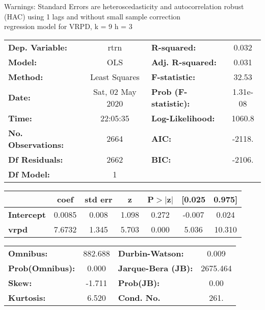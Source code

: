 Warnings: \newline
 [1] Standard Errors are heteroscedasticity and autocorrelation robust (HAC) using 1 lags and without small sample correction\\ 

regression model for VRPD, k = 9 h = 3\begin{center}
\begin{tabular}{lclc}
\toprule
\textbf{Dep. Variable:}    &       rtrn       & \textbf{  R-squared:         } &     0.032   \\
\textbf{Model:}            &       OLS        & \textbf{  Adj. R-squared:    } &     0.031   \\
\textbf{Method:}           &  Least Squares   & \textbf{  F-statistic:       } &     32.53   \\
\textbf{Date:}             & Sat, 02 May 2020 & \textbf{  Prob (F-statistic):} &  1.31e-08   \\
\textbf{Time:}             &     22:05:35     & \textbf{  Log-Likelihood:    } &    1060.8   \\
\textbf{No. Observations:} &        2664      & \textbf{  AIC:               } &    -2118.   \\
\textbf{Df Residuals:}     &        2662      & \textbf{  BIC:               } &    -2106.   \\
\textbf{Df Model:}         &           1      & \textbf{                     } &             \\
\bottomrule
\end{tabular}
\begin{tabular}{lcccccc}
                   & \textbf{coef} & \textbf{std err} & \textbf{z} & \textbf{P$> |$z$|$} & \textbf{[0.025} & \textbf{0.975]}  \\
\midrule
\textbf{Intercept} &       0.0085  &        0.008     &     1.098  &         0.272        &       -0.007    &        0.024     \\
\textbf{vrpd}      &       7.6732  &        1.345     &     5.703  &         0.000        &        5.036    &       10.310     \\
\bottomrule
\end{tabular}
\begin{tabular}{lclc}
\textbf{Omnibus:}       & 882.688 & \textbf{  Durbin-Watson:     } &    0.009  \\
\textbf{Prob(Omnibus):} &   0.000 & \textbf{  Jarque-Bera (JB):  } & 2675.464  \\
\textbf{Skew:}          &  -1.711 & \textbf{  Prob(JB):          } &     0.00  \\
\textbf{Kurtosis:}      &   6.520 & \textbf{  Cond. No.          } &     261.  \\
\bottomrule
\end{tabular}
\end{center}

